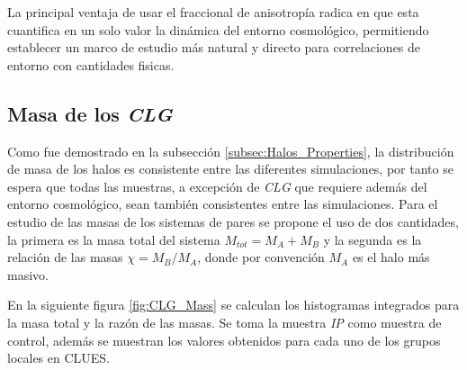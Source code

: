 La principal ventaja de usar el fraccional de anisotropía radica en que 
esta cuantifica en un solo valor la dinámica del entorno cosmológico, 
permitiendo establecer un marco de estudio más natural y directo para 
correlaciones de entorno con cantidades fisicas.


	\subsection{Masa de los \textit{CLG}}
	\label{subsec:CLG_Mass}
	

Como fue demostrado en la subsección \ref{subsec:Halos_Properties}, la 
distribución de masa de los halos es consistente entre las diferentes
simulaciones, por tanto se espera que todas las muestras, a excepción de 
\textit{CLG} que requiere además del entorno cosmológico, sean también
consistentes entre las simulaciones. Para el estudio de las masas de los
sistemas de pares se propone el uso de dos cantidades, la primera es la
masa total del sistema $M_{tot} = M_A + M_B$ y la segunda es la relación 
de las masas $\chi = M_B/M_A$, donde por convención $M_A$ es el halo más 
masivo.


En la siguiente figura \ref{fig:CLG_Mass} se calculan los histogramas 
integrados para la masa total y la razón de las masas. Se toma la muestra
\textit{IP} como muestra de control, además se muestran los valores 
obtenidos para cada uno de los grupos locales en CLUES.


